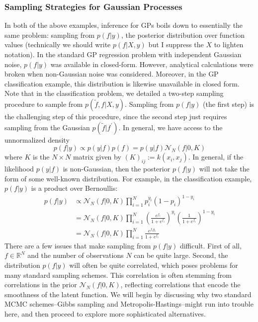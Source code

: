 \documentclass[12pt]{article}
\newcommand{\R}{\mathcal{R}}
\def\R{\mathbb{R}}
\begin{document}
\subsubsection{Sampling Strategies for Gaussian Processes}
In both of the above examples, inference for GPs boils down to essentially the same problem: sampling from $p(f|y)$, the posterior distribution over function values
(technically we should write $p(f|X, y)$ but I suppress the $X$ to lighten notation). In the standard GP regression problem with independent Gaussian noise, $p(f|y)$
was available in closed-form. However, analytical calculations were broken when non-Gaussian noise was considered. Moreover, in the GP classification example, this 
distribution is likewise unavailable in closed form. Note that in the classification problem, we detailed a two-step sampling procedure to sample from 
$p(\tilde{f}, f|X, y)$. Sampling from $p(f|y)$ (the first step) is the challenging step of this procedure, since the second step just requires sampling from the Gaussian 
$p(\tilde{f}|f^\prime)$. In general, we have access to the unnormalized density
\[p(f|y) \propto p(y|f)p(f) = p(y|f)\mathcal{N}_N(f|0, K)\]
where $K$ is the $N \times N$ matrix given by $(K)_{ij} := k(x_i, x_j)$. In general, if the likelihood $p(y|f)$ is non-Gaussian, then the posterior $p(f|y)$ will not take the 
form of some well-known distribution. For example, in the classification example, $p(f|y)$ is a product over Bernoullis:
\begin{align}
p(f|y) &\propto \mathcal{N}_N(f|0, K) \prod_{i = 1}^{N} p_i^{y_i}(1 - p_i)^{1 - y_i} \label{logistic_post} \\
	 &= \mathcal{N}_N(f|0, K) \prod_{i = 1}^{N} \left(\frac{e^{f_i}}{1 + e^{f_i}}\right)^{y_i}\left(\frac{1}{1 + e^{f_i}}\right)^{1 - y_i} \nonumber \\
	 &= \mathcal{N}_N(f|0, K) \prod_{i = 1}^{N} \frac{e^{f_i y_i}}{1 + e^{f_i}} \nonumber
\end{align}
There are a few issues that make sampling from $p(f|y)$ difficult. First of all, $f \in \R^N$ and the number of observations $N$ can be quite large. Second, the distribution 
$p(f|y)$ will often be quite correlated, which poses problems for many standard sampling schemes. This correlation is often stemming from correlations in the prior
$\mathcal{N}_N(f|0, K)$, reflecting correlations that encode the smoothness of the latent function. We will begin by discussing why two standard MCMC schemes--Gibbs sampling
and Metropolis-Hastings--might run into trouble here, and then proceed to explore more sophisticated alternatives.  
\end{document}
